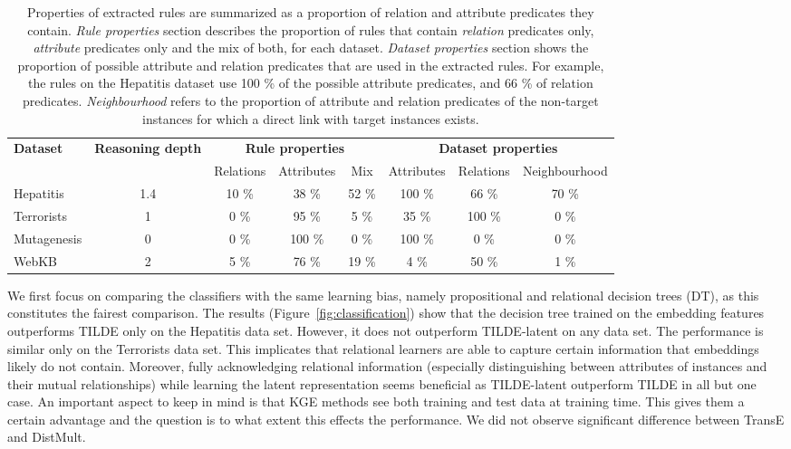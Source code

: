 \begin{table*}[h!]
	\centering
	
	\caption{Properties of extracted rules are summarized as a proportion of relation and attribute predicates they contain. \textit{Rule properties} section describes the proportion of rules that contain  \textit{relation} predicates only, \textit{attribute} predicates only and the mix of both, for each dataset. \textit{Dataset properties} section shows the proportion of possible attribute and relation predicates that are used in the extracted rules. For example, the rules on the Hepatitis dataset use 100 \% of the possible attribute predicates, and 66 \% of relation predicates. \textit{Neighbourhood} refers to the proportion of attribute and relation predicates of the non-target instances for which a direct link with target instances exists. }
	\begin{tabular}{@{}lccccccc@{}}
		\toprule
		\textbf{Dataset}		& \textbf{Reasoning depth} 	& \multicolumn{3}{c}{\textbf{Rule properties}} 	& \multicolumn{3}{c}{\textbf{Dataset properties}} \\
		\cmidrule(lr){3-5} \cmidrule(l){6-8}
							& 				  			& Relations   		& Attributes 	& Mix		& Attributes        & Relations	& Neighbourhood	     \\
							\midrule 
		Hepatitis   		& 1.4				  		& 10 \%				& 38 \%			& 52 \%		& 100 \%					&  66 \%				& 70 \%				\\
		Terrorists			& 1							& 0	\%				& 95 \%			& 5 \%		& 35 \%				& 100 \%		& 0 \%			\\
		Mutagenesis			& 0							& 0 \%				& 100 \%		& 0 \%		& 100 \%					& 0 \%	& 0 \%				\\
		WebKB				& 2							& 5 \%				& 76 \%			& 19 \%		& 4 \%				& 50 \%		& 1 \%		\\ 	\bottomrule 	
	\end{tabular}
	\label{tab:ruleproperties}
\end{table*}


We first focus on comparing the classifiers with the same learning bias, namely propositional and relational decision trees (DT), as this constitutes the fairest comparison.
The results (Figure~\ref{fig:classification}) show that the decision tree trained on the embedding features outperforms TILDE only on the Hepatitis data set.
However, it does not outperform TILDE-latent on any data set. The performance is similar only on the Terrorists data set.
This implicates that relational learners are able to capture certain information that embeddings likely do not contain.
Moreover, fully acknowledging relational information (especially distinguishing between attributes of instances and their mutual relationships) while learning the latent representation \cite{Dumancic2017} seems beneficial as TILDE-latent outperform TILDE in all but one case.
An important aspect to keep in mind is that KGE methods see both training and test data at training time.
This gives them a certain advantage and the question is to what extent this effects the performance.
We did not observe significant difference between TransE and DistMult.


